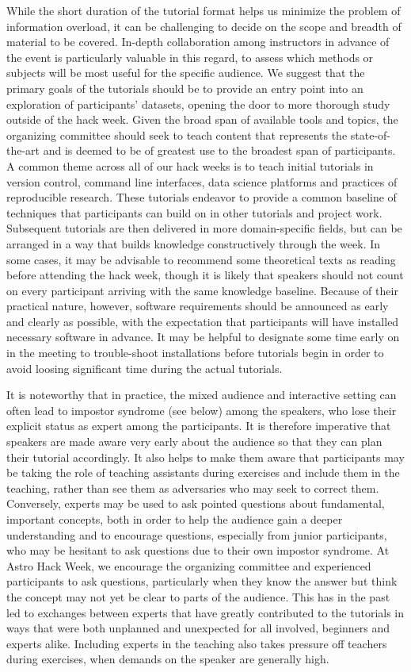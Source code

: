 \documentclass{nature}
\begin{document}
While the short duration of the tutorial format helps us minimize the problem of information overload, it can be challenging to decide on the scope and breadth of material to be covered. In-depth collaboration among instructors in advance of the event is particularly valuable in this regard, to assess which methods or subjects will be most useful for the specific audience. We suggest that the primary goals of the tutorials should be to provide an entry point into an exploration of participants' datasets, opening the door to more thorough study outside of the hack week. Given the broad span of available tools and topics, the organizing committee should seek to teach content that represents the state-of-the-art and is deemed to be of greatest use to the broadest span of participants. A common theme across all of our hack weeks is to teach initial tutorials in version control, command line interfaces, data science platforms and practices of reproducible research. These tutorials endeavor to provide a common baseline of techniques that participants can build on in other tutorials and project work. Subsequent tutorials are then delivered in more domain-specific fields, but can be arranged in a way that builds knowledge constructively through the week. In some cases, it may be advisable to recommend some theoretical texts as reading before attending the hack week, though it is likely that speakers should not count on every participant arriving with the same knowledge baseline. Because of their practical nature, however, software requirements should be announced as early and clearly as possible, with the expectation that participants will have installed necessary software in advance. It may be helpful to designate some time early on in the meeting to trouble-shoot installations before tutorials begin in order to avoid loosing significant time during the actual tutorials.

It is noteworthy that in practice, the mixed audience and interactive setting can often lead to impostor syndrome (see below) among the speakers, who lose their explicit status as expert among the participants. It is therefore imperative that speakers are made aware very early about the audience so that they can plan their tutorial accordingly. It also helps to make them aware that participants may be taking the role of teaching assistants during exercises and include them in the teaching, rather than see them as adversaries who may seek to correct them. Conversely, experts may be used to ask pointed questions about fundamental, important concepts, both in order to help the audience gain a deeper understanding and to encourage questions, especially from junior participants, who may be hesitant to ask questions due to their own impostor syndrome. At Astro Hack Week, we encourage the organizing committee and experienced participants to ask questions, particularly when they know the answer but think the concept may not yet be clear to parts of the audience. This has in the past led to exchanges between experts that have greatly contributed to the tutorials in ways that were both unplanned and unexpected for all involved, beginners and experts alike. Including experts in the teaching also takes pressure off teachers during exercises, when demands on the speaker are generally high.
\end{document}
